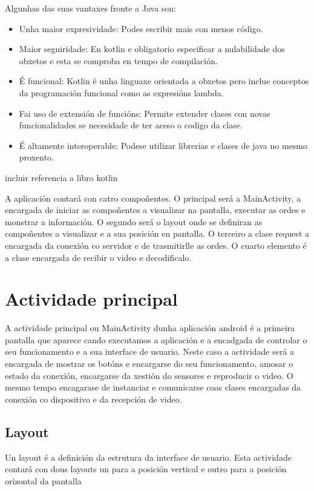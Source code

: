 Algunhas das suas vantaxes fronte a Java son:
\begin{itemize}
    \item Unha maior expresividade: Podes escribir mais con menos código.
    \item Maior seguiridade: En kotlin e obligatorio especificar a nulabilidade dos obxetos e esta se comproba en tempo de compilación.
    \item É funcional: Kotlin é unha linguaxe orientada a obxetos pero inclue conceptos da programación funcional como as expresións lambda.
    \item Fai uso de extensión de funcións: Permite extender clases con novas funcionalidades se necesidade de ter aceso o codigo da clase.
    \item É altamente interoperable: Podese utilizar librerias e  clases de java no mesmo proxento.
\end{itemize}
incluir referencia a libro kotlin

A aplicación contará con catro compoñentes. O principal será a MainActivity, a encargada de iniciar as compoñentes a visualizar na pantalla, executar as ordes e monstrar a información. O segundo será o layout onde se definiran as compoñentes a visualizar e a sua posición en pantalla. O terceiro a clase request a encargada da conexión co servidor e de trasmitirlle as ordes. O cuarto elemento é a clase encargada de recibir o video e decodificalo.

\section{Actividade principal}
A actividade principal ou MainActivity dunha aplicación android é a primeira pantalla que aparece cando executamos a aplicación e a encadgada de controlar o seu funcionamento e a sua interface de usuario. Neste caso a actividade será a encargada de mostrar os botóns e encargarse do seu funcionamento, amosar o estado da conexión, encargarse da xestión do sensores e reproducir o video. O mesmo tempo encagarase de instanciar e comunicarse coas clases encargadas da conexión co dispositivo e da recepción de video.

\subsection{Layout}
Un layout é a definición da estrutura da interface de usuario. Esta actividade contará con dous layouts un para a posición vertical e outro para a posición orizontal da pantalla
